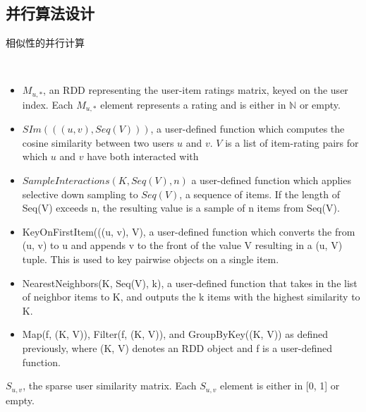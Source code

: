 \subsection{并行算法设计}
    \begin{algorithm}
        \caption{相似性的并行计算}
        \begin{algorithmic}[1] %
            \Require \\
            \begin{itemize}
                \item $M_{u, *}$, an RDD representing the user-item ratings matrix, keyed on the user index. Each $M_{u,*}$ element represents a rating and is either in $\mathbb{N}$ or empty.
                \item $SIm(((u, v), Seq(V)))$, a user-defined function which computes the cosine similarity between two users $u$ and $v$. $V$ is a list of item-rating pairs for which $u$ and $v$ have both interacted with %
                \item $SampleInteractions(K, Seq(V), n)$ a user-defined function which applies selective down sampling to $Seq(V)$, a sequence of items. If the length of Seq(V) exceeds n, the resulting value is a sample of n items from Seq(V).
                \item KeyOnFirstItem(((u, v), V), a user-defined function which converts the from (u, v) to u and appends v to the front of the value V resulting in a (u, V) tuple. This is used to key pairwise objects on a single item.
                \item NearestNeighbors(K, Seq(V), k), a user-defined function that takes in the list of neighbor items to K, and outputs the k items with the highest similarity to K.
                \item Map(f, (K, V)), Filter(f, (K, V)), and GroupByKey((K, V)) as defined previously, where (K, V) denotes an RDD object and f is a user-defined function.
            \end{itemize}
            \Ensure $S_{u,v}$, the sparse user similarity matrix. Each $S_{u, v}$ element is either in [0, 1] or empty.

\end{algorithmic}
\end{algorithm}
